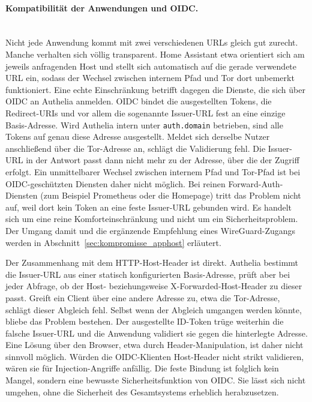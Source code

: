 \paragraph{Kompatibilität der Anwendungen und \ac{OIDC}.} \mbox{}\\
Nicht jede Anwendung kommt mit zwei verschiedenen \acp{URL} gleich gut
zurecht. Manche verhalten sich völlig transparent. Home Assistant etwa
orientiert sich am jeweils anfragenden Host und stellt sich automatisch auf
die gerade verwendete \ac{URL} ein, sodass der Wechsel zwischen internem Pfad
und Tor dort unbemerkt funktioniert. Eine echte Einschränkung betrifft
dagegen die Dienste, die sich über \ac{OIDC} an Authelia anmelden. \ac{OIDC}
bindet die ausgestellten Tokens, die Redirect-\acp{URI} und vor allem die
sogenannte Issuer-\ac{URL} fest an eine einzige Basis-Adresse. Wird Authelia
intern unter \texttt{auth.domain} betrieben, sind alle Tokens auf genau diese
Adresse ausgestellt. Meldet sich derselbe Nutzer anschließend über die
Tor-Adresse an, schlägt die Validierung fehl. Die Issuer-\ac{URL} in der
Antwort passt dann nicht mehr zu der Adresse, über die der Zugriff erfolgt.
Ein unmittelbarer Wechsel zwischen internem Pfad und Tor-Pfad ist bei
\ac{OIDC}-geschützten Diensten daher nicht möglich. Bei reinen
Forward-Auth-Diensten (zum Beispiel Prometheus oder die Homepage) tritt das
Problem nicht auf, weil dort kein Token an eine feste Issuer-\ac{URL}
gebunden wird. Es handelt sich um eine reine Komforteinschränkung und nicht
um ein Sicherheitsproblem. Der Umgang damit und die ergänzende Empfehlung
eines WireGuard-Zugangs werden in Abschnitt~\ref{sec:kompromisse_apphost}
erläutert.

Der Zusammenhang mit dem \ac{HTTP}-Host-Header ist direkt. Authelia bestimmt
die Issuer-\ac{URL} aus einer statisch konfigurierten Basis-Adresse, prüft
aber bei jeder Abfrage, ob der Host- beziehungsweise
X-Forwarded-Host-Header zu dieser passt. Greift ein Client über eine andere
Adresse zu, etwa die Tor-Adresse, schlägt dieser Abgleich fehl. Selbst wenn
der Abgleich umgangen werden könnte, bliebe das Problem bestehen. Der
ausgestellte \ac{ID}-Token trüge weiterhin die falsche Issuer-\ac{URL} und
die Anwendung validiert sie gegen die hinterlegte Adresse. Eine Lösung über
den Browser, etwa durch Header-Manipulation, ist daher nicht sinnvoll
möglich. Würden die \ac{OIDC}-Klienten Host-Header nicht strikt validieren,
wären sie für Injection-Angriffe anfällig. Die feste Bindung ist folglich
kein Mangel, sondern eine bewusste Sicherheitsfunktion von \ac{OIDC}. Sie
lässt sich nicht umgehen, ohne die Sicherheit des Gesamtsystems erheblich
herabzusetzen.

